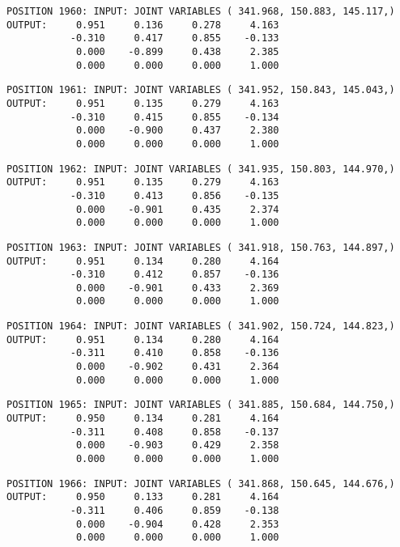 \begin{verbatim}
POSITION 1960: INPUT: JOINT VARIABLES ( 341.968, 150.883, 145.117,)
OUTPUT:     0.951     0.136     0.278     4.163
           -0.310     0.417     0.855    -0.133
            0.000    -0.899     0.438     2.385
            0.000     0.000     0.000     1.000
\end{verbatim} \pagebreak[1]\begin{verbatim}
POSITION 1961: INPUT: JOINT VARIABLES ( 341.952, 150.843, 145.043,)
OUTPUT:     0.951     0.135     0.279     4.163
           -0.310     0.415     0.855    -0.134
            0.000    -0.900     0.437     2.380
            0.000     0.000     0.000     1.000
\end{verbatim} \pagebreak[1]\begin{verbatim}
POSITION 1962: INPUT: JOINT VARIABLES ( 341.935, 150.803, 144.970,)
OUTPUT:     0.951     0.135     0.279     4.163
           -0.310     0.413     0.856    -0.135
            0.000    -0.901     0.435     2.374
            0.000     0.000     0.000     1.000
\end{verbatim} \pagebreak[1]\begin{verbatim}
POSITION 1963: INPUT: JOINT VARIABLES ( 341.918, 150.763, 144.897,)
OUTPUT:     0.951     0.134     0.280     4.164
           -0.310     0.412     0.857    -0.136
            0.000    -0.901     0.433     2.369
            0.000     0.000     0.000     1.000
\end{verbatim} \pagebreak[1]\begin{verbatim}
POSITION 1964: INPUT: JOINT VARIABLES ( 341.902, 150.724, 144.823,)
OUTPUT:     0.951     0.134     0.280     4.164
           -0.311     0.410     0.858    -0.136
            0.000    -0.902     0.431     2.364
            0.000     0.000     0.000     1.000
\end{verbatim} \pagebreak[1]\begin{verbatim}
POSITION 1965: INPUT: JOINT VARIABLES ( 341.885, 150.684, 144.750,)
OUTPUT:     0.950     0.134     0.281     4.164
           -0.311     0.408     0.858    -0.137
            0.000    -0.903     0.429     2.358
            0.000     0.000     0.000     1.000
\end{verbatim} \pagebreak[1]\begin{verbatim}
POSITION 1966: INPUT: JOINT VARIABLES ( 341.868, 150.645, 144.676,)
OUTPUT:     0.950     0.133     0.281     4.164
           -0.311     0.406     0.859    -0.138
            0.000    -0.904     0.428     2.353
            0.000     0.000     0.000     1.000
\end{verbatim} \pagebreak[1]\begin{verbatim}

\end{verbatim}
